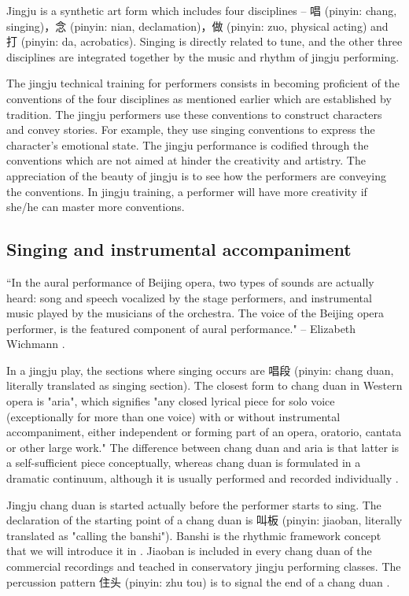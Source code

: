 Jingju is a synthetic art form which includes four disciplines -- 唱 (pinyin: chang, singing)，念 (pinyin: nian, declamation)，做 (pinyin: zuo, physical acting) and 打 (pinyin: da, acrobatics). Singing is directly related to tune, and the other three disciplines are integrated together by the music and rhythm of jingju performing. 

The jingju technical training for performers consists in becoming proficient of the conventions of the four disciplines as mentioned earlier which are established by tradition. The jingju performers use these conventions to construct characters and convey stories. For example, they use singing conventions to express the character's emotional state. The jingju performance is codified through the conventions which are not aimed at hinder the creativity and artistry. The appreciation of the beauty of jingju is to see how the performers are conveying the conventions. In jingju training, a performer will have more creativity if she/he can master more conventions.

\subsection{Singing and instrumental accompaniment}

``In the aural performance of Beijing opera, two types of sounds are actually heard: song and speech vocalized by the stage performers, and instrumental music played by the musicians of the orchestra. The voice of the Beijing opera performer, is the featured component of aural performance." -- Elizabeth Wichmann \cite{Wichmann1991a}.

In a jingju play, the sections where singing occurs are 唱段 (pinyin: chang duan, literally translated as singing section). The closest form to chang duan in Western opera is "aria", which signifies "any closed lyrical piece for solo voice (exceptionally for more than one voice) with or without instrumental accompaniment, either independent or forming part of an opera, oratorio, cantata or other large work." The difference between chang duan and aria is that latter is a self-sufficient piece conceptually, whereas chang duan is formulated in a dramatic continuum, although it is usually performed and recorded individually \cite{Repetto2018}. 

Jingju chang duan is started actually before the performer starts to sing. The declaration of the starting point of a chang duan is 叫板 (pinyin: jiaoban, literally translated as "calling the banshi"). Banshi is the rhythmic framework concept that we will introduce it in . Jiaoban is included in every chang duan of the commercial recordings and teached in conservatory jingju performing classes. The percussion pattern 住头 (pinyin: zhu tou) is to signal the end of a chang duan \cite{Mu2007a}.

